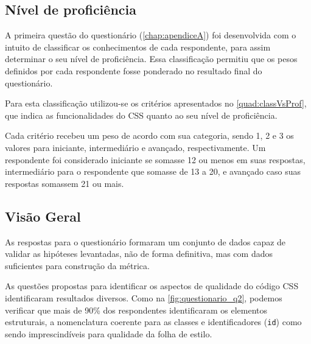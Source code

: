 \subsection{Nível de proficiência}

A primeira questão do questionário (\autoref{chap:apendiceA}) foi desenvolvida com o intuito de classificar os conhecimentos de cada respondente, para assim determinar o seu nível de proficiência. Essa classificação permitiu que os pesos definidos por cada respondente fosse ponderado no resultado final do questionário.

Para esta classificação utilizou-se os critérios apresentados no \autoref{quad:classVsProf}, que indica as funcionalidades do CSS quanto ao seu nível de proficiência.



Cada critério recebeu um peso de acordo com sua categoria, sendo 1, 2 e 3 os valores para iniciante, intermediário e avançado, respectivamente. Um respondente foi considerado iniciante se somasse 12 ou menos em suas respostas, intermediário para o respondente que somasse de 13 a 20, e avançado caso suas respostas somassem 21 ou mais. 

\subsection{Visão Geral}

As respostas para o questionário formaram um conjunto de dados capaz de validar as hipóteses levantadas, não de forma definitiva, mas com dados suficientes para construção da métrica.

As questões propostas para identificar os aspectos de qualidade do código CSS identificaram resultados diversos. Como na \autoref{fig:questionario_q2}, podemos verificar que mais de 90\% dos respondentes identificaram os elementos estruturais, a nomenclatura coerente para as classes e identificadores (\texttt{id}) como sendo imprescindíveis para qualidade da folha de estilo.

